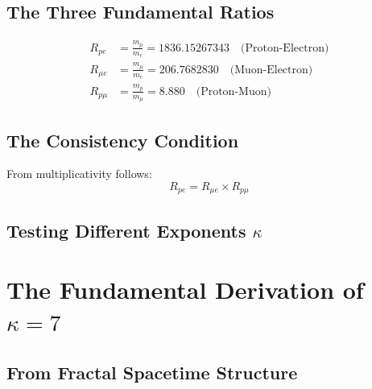 	\subsection{The Three Fundamental Ratios}
	
	\begin{align}
		R_{pe} &= \frac{m_p}{m_e} = 1836.15267343 \quad \text{(Proton-Electron)} \\
		R_{\mu e} &= \frac{m_{\mu}}{m_e} = 206.7682830 \quad \text{(Muon-Electron)} \\
		R_{p\mu} &= \frac{m_p}{m_{\mu}} = 8.880 \quad \text{(Proton-Muon)}
	\end{align}
	
	\subsection{The Consistency Condition}
	
	From multiplicativity follows:
	\begin{equation}
		R_{pe} = R_{\mu e} \times R_{p\mu}
	\end{equation}
	
	\subsection{Testing Different Exponents $\kappa$}
	
	\begin{table}[htbp]
		\centering
		\caption{$\kappa = 7$ is the only consistent solution}
	\end{table}
	
	\section{The Fundamental Derivation of $\kappa = 7$}
	
	\subsection{From Fractal Spacetime Structure}
	
